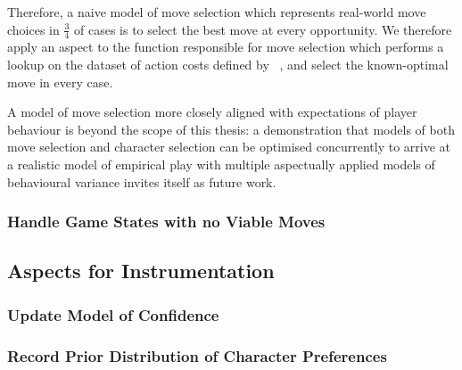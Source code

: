 Therefore, a naive model of move selection which represents real-world move
choices in \(\frac{3}{4}\) of cases is to select the best move at every
opportunity. We therefore apply an aspect to the function responsible for move
selection which performs a lookup on the dataset of action costs defined by
\citeauthor{kavanagh2021gameplay}~\cite{kavanagh2021gameplay}, and select the
known-optimal move in every case.

A model of move selection more closely aligned with expectations of player
behaviour is beyond the scope of this thesis: a demonstration that models of
both move selection and character selection can be optimised concurrently to
arrive at a realistic model of empirical play with multiple aspectually applied
models of behavioural variance invites itself as future work.


\subsubsection{Handle Game States with no Viable Moves}





\subsection{Aspects for Instrumentation}\label{subsec:aspects_instrumenting_model}

\subsubsection{Update Model of Confidence}

\subsubsection{Record Prior Distribution of Character Preferences}

